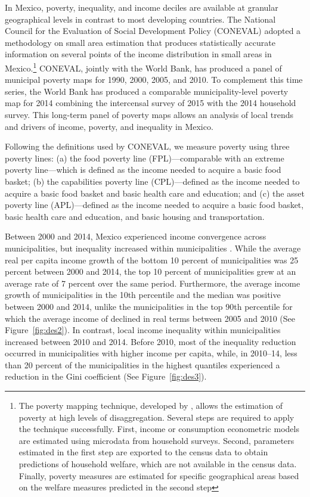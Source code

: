 \documentclass[dv_diss_main.tex]{subfiles}
\begin{document}
In Mexico, poverty, inequality, and income deciles are available at granular geographical levels in contrast to most developing countries. The National Council for the Evaluation of Social Development Policy (CONEVAL) adopted a methodology on small area estimation that produces statistically accurate information on several points of the income distribution in small areas in Mexico.\footnote{The poverty mapping technique, developed by \cite{elbers2003micro}, allows the estimation of poverty at high levels of disaggregation. Several steps are required to apply the technique successfully. First, income or consumption econometric models are estimated using microdata from household surveys. Second, parameters estimated in the first step are exported to the census data to obtain predictions of household welfare, which are not available in the census data. Finally, poverty measures are estimated for specific geographical areas based on the welfare measures predicted in the second step} CONEVAL, jointly with the World Bank, has produced a panel of municipal poverty maps for 1990, 2000, 2005, and 2010. To complement this time series, the World Bank has produced a comparable municipality-level poverty map for 2014 combining the intercensal survey of 2015 with the 2014 household survey. This long-term panel of poverty maps allows an analysis of local trends and drivers of income, poverty, and inequality in Mexico.

Following the definitions used by CONEVAL, we measure poverty using three poverty lines: (a) the food poverty line (FPL)—comparable with an extreme poverty line—which is defined as the income needed to acquire a basic food basket; (b) the capabilities poverty line (CPL)—defined as the income needed to acquire a basic food basket and basic health care and education; and (c) the asset poverty line (APL)—defined as the income needed to acquire a basic food basket, basic health care and education, and basic housing and transportation.

Between 2000 and 2014, Mexico experienced income convergence across municipalities, but inequality increased within municipalities \cite{lopez2019poverty}. While the average real per capita income growth of the bottom 10 percent of municipalities was 25 percent between 2000 and 2014, the top 10 percent of municipalities grew at an average rate of  7 percent over the same period. Furthermore, the average income growth of municipalities in the 10th percentile and the median was positive between 2000 and 2014, unlike the municipalities in the top 90th percentile for which the average income of declined in real terms between 2005 and 2010 (See Figure~\ref{fig:des2}). In contrast, local income inequality within municipalities increased between 2010 and 2014. Before 2010, most of the inequality reduction occurred in municipalities with higher income per capita, while, in 2010–14, less than 20 percent of the municipalities in the highest quantiles experienced a reduction in the Gini coefficient (See Figure~\ref{fig:des3}).
\end{document}
